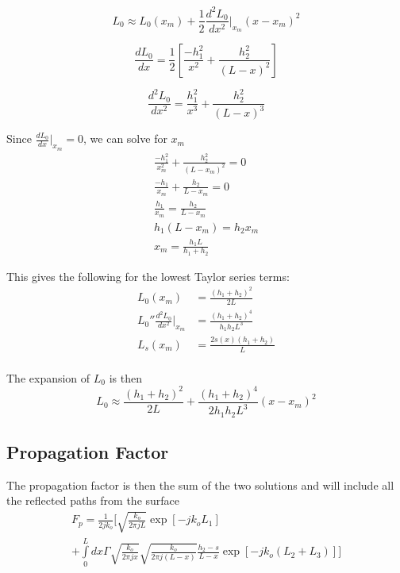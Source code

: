 \begin{equation}
L_0 \approx L_0(x_m) + \frac{1}{2}\frac{d^2L_0}{dx^2}\bigg|_{x_m}(x-x_m)^2
\label{mp_eq:14}
\end{equation}

\begin{equation}
\frac{dL_0}{dx} = \frac{1}{2}\left[\frac{-h_1^2}{x^2} + \frac{h_2^2}{(L-x)^2} \right]
\label{mp_eq:15}
\end{equation}

\begin{equation}
\frac{d^2L_0}{dx^2} = \frac{h_1^2}{x^3} + \frac{h_2^2}{(L-x)^3} 
\label{mp_eq:16}
\end{equation}

Since $\frac{dL_0}{dx}\big|_{x_m} = 0$, we can solve for $x_m$
\begin{equation}
\begin{gathered}
\frac{-h_1^2}{x_m^2} + \frac{h_2^2}{(L-x_m)^2} = 0\\
\frac{-h_1}{x_m} + \frac{h_2}{L-x_m} = 0\\
\frac{h_1}{x_m} = \frac{h_2}{L-x_m}\\
h_1(L-x_m) = h_2x_m\\
x_m = \frac{h_1L}{h_1+h_2}
\end{gathered}
\label{mp_eq:17}
\end{equation}

This gives the following for the lowest Taylor series terms:
\begin{equation}
\begin{aligned}
L_0(x_m) &= \frac{(h_1+h_2)^2}{2L} \\
L_0''\frac{d^2L_0}{dx^2}\bigg|_{x_m}  &= \frac{(h_1+h_2)^4}{h_1h_2L^3} \\
L_s(x_m) &= \frac{2s(x)(h_1 + h_2)}{L}\\
\end{aligned}
\label{mp_eq:17a}
\end{equation}

The expansion of $L_0$ is then
\begin{equation}
L_0 \approx \frac{(h_1+h_2)^2}{2L} + \frac{(h_1+h_2)^4}{2h_1h_2L^3}(x-x_m)^2
\label{mp_eq:18}
\end{equation}

\subsection{Propagation Factor}
The propagation factor is then the sum of the two solutions and will include all the reflected paths from the surface
\begin{equation}
\begin{gathered}
F_p= \frac{1}{2jk_o}\Biggl[\sqrt{\frac{k_o}{2\pi jL}}\exp\left[-jk_oL_1 \right]\\+ \int\limits_{0}^{L}dx\Gamma \sqrt{\frac{k_o}{2\pi jx}}\sqrt{\frac{k_o}{2\pi j (L-x)}}\frac{h_2-s}{L-x}\exp\left[-jk_o\left( L_2 + L_3\right) \right]\Biggr]
\label{mp_eq:12h}
\end{gathered}
\end{equation}
\renewcommand{\baselinestretch}{2} \small\normalsize

